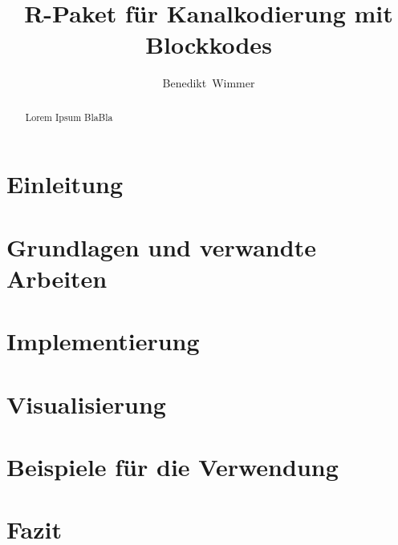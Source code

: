 \documentclass[germanthesis]{thesis-style}
\author{Benedikt~Wimmer}
\title{R-Paket für Kanalkodierung mit Blockkodes}
\begin{document}
\maketitle

\begin{abstract}
Lorem Ipsum BlaBla
\end{abstract}
%

\tableofcontents
{}

\chapter{Einleitung}
\label{chapter:introduction}





\chapter{Grundlagen und verwandte Arbeiten}
\label{chapter:theory}


\chapter{Implementierung}
\label{chapter:implementation}


\chapter{Visualisierung}
\label{chapter:visualization}


\chapter{Beispiele für die Verwendung}
\label{chapter:examples}

\chapter{Fazit}
\label{chapter:conclusion}

\cleardoublepage%
\end{document}
